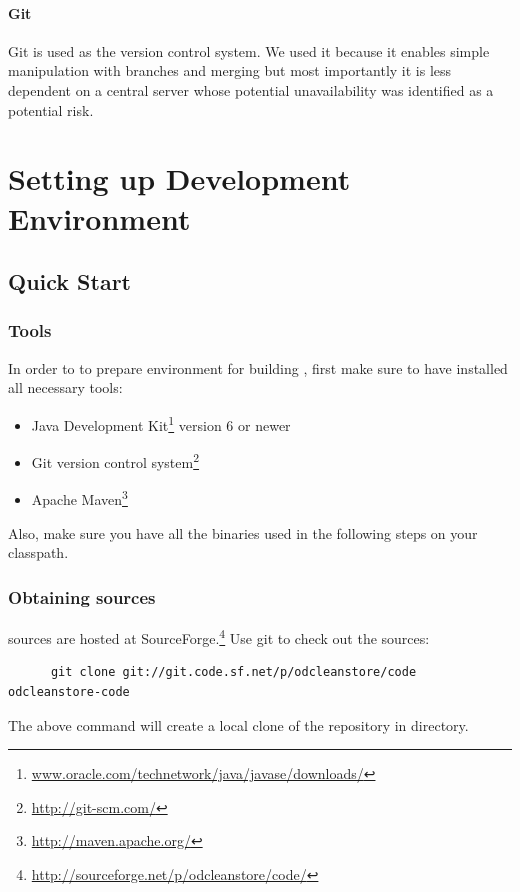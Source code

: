 \subsubsection*{Git}
Git is used as the version control system. We used it because it enables simple manipulation with branches and merging but most importantly it is less dependent on a central server whose potential unavailability was identified as a potential risk.



\chapter{Setting up Development Environment}

\section{Quick Start}
\subsection{Tools}
	In order to to prepare environment for building \odcs, first make sure to have installed all necessary tools:

\begin{itemize}
	\item Java Development Kit\footnote{\url{www.oracle.com/technetwork/java/javase/downloads/}} version 6 or newer
	\item Git version control system\footnote{\url{http://git-scm.com/}}
	\item Apache Maven\footnote{\url{http://maven.apache.org/}}
\end{itemize}

Also, make sure you have all the binaries used in the following steps on your classpath. 

\subsection{Obtaining sources} 
\odcs sources are hosted at SourceForge.\footnote{\url{http://sourceforge.net/p/odcleanstore/code/}} Use git to check out the sources:

\begin{verbatim}
      git clone git://git.code.sf.net/p/odcleanstore/code odcleanstore-code
\end{verbatim}

The above command will create a local clone of the repository in  directory.

